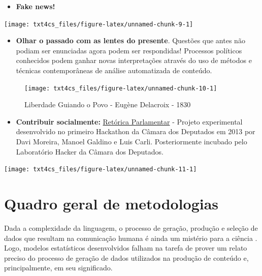 \documentclass[]{book}
\providecommand{\tightlist}{%
  \setlength{\itemsep}{0pt}\setlength{\parskip}{0pt}}
\begin{document}
\begin{itemize}
\tightlist
\item
  \textbf{Fake news!}
\end{itemize}

\begin{center}\texttt{[image: txt4cs\_files/figure-latex/unnamed-chunk-9-1]} \end{center}

\begin{itemize}
\tightlist
\item
  \textbf{Olhar o passado com as lentes do presente}. Questões que antes não podiam ser enunciadas agora podem ser respondidas! Processos políticos conhecidos podem ganhar novas interpretações através do uso de métodos e técnicas contemporâneas de análise automatizada de conteúdo.
\end{itemize}

\begin{figure}

{\centering \texttt{[image: txt4cs\_files/figure-latex/unnamed-chunk-10-1]} 

}

\caption{Liberdade Guiando o Povo - Eugène Delacroix - 1830}\label{fig:unnamed-chunk-10}
\end{figure}

\begin{itemize}
\tightlist
\item
  \textbf{Contribuir socialmente:} \href{http://retorica.labhackercd.leg.br/}{Retórica Parlamentar} - Projeto experimental desenvolvido no primeiro Hackathon da Câmara dos Deputados em 2013 por Davi Moreira, Manoel Galdino e Luis Carli. Posteriormente incubado pelo Laboratório Hacker da Câmara dos Deputados.
\end{itemize}

\begin{center}\texttt{[image: txt4cs\_files/figure-latex/unnamed-chunk-11-1]} \end{center}

\hypertarget{quadro-geral-de-metodologias}{%
\section{Quadro geral de metodologias}\label{quadro-geral-de-metodologias}}

Dada a complexidade da linguagem, o processo de geração, produção e seleção de dados que resultam na comunicação humana é ainda um mistério para a ciência \citep{izumi_o_2018, grimmer_text_2013}. Logo, modelos estatísticos desenvolvidos falham na tarefa de prover um relato preciso do processo de geração de dados utilizados na produção de conteúdo e, principalmente, em seu significado.
\end{document}
